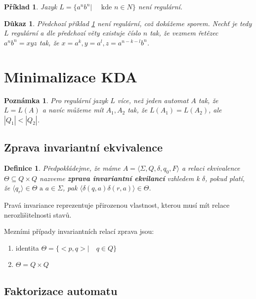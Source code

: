 \documentclass[10pt, a4paper, titlepage]{article}
\theoremstyle{note}
\newtheorem{definice}{\textbf{Definice}}
\newtheorem{dukaz}{\textbf{Důkaz}}
\newtheorem{priklad}{\textbf{Příklad}}
\newtheorem{poznamka}{\textbf{Poznámka}}
\begin{document}
\begin{priklad}\label{priklad-reg}
 Jazyk $L = \lbrace a^{n}b^{n} | \quad \text{ kde } n \in N \rbrace$ není regulární.
\end{priklad}

\begin{dukaz}
 Předchozí příklad \ref{priklad-reg} není regulární, což dokážeme sporem. Nechť je tedy $L$ regulární a dle předchozí
věty existuje číslo $n$ tak, že vezmem řetězec $a^{n}b^{n} = xyz$ tak, že $x = a^{k}, y = a^{l}, z = a^{n-k-l}b^{n}$.
\end{dukaz}


\section{Minimalizace KDA}

\begin{poznamka}
Pro regulární jazyk $L$ více, než jeden automat $A$ tak, že $L = L(A)$ a navíc můžeme mít $A_{1}, A_{2}$ tak, že
$L(A_{1}) = L(A_{2})$, ale $|Q_{1}| < |Q_{2}|$.
\end{poznamka}

\subsection{Zprava invariantní ekvivalence}

\begin{definice}
Předpokládejme, že máme $A = \langle \Sigma, Q, \delta, q_{0}, F \rangle$ a relaci ekvivalence $\Theta \subseteq Q \times Q$ nazveme
\textbf{zprava invariantní ekvilancí} vzhledem k $\delta$, pokud platí, že $\langle q_{r}  \rangle \in \Theta \text{ a } a \in \Sigma$,
pak $\langle  \delta(q, a) \delta(r, a) \rangle \in \Theta$.
\end{definice}

Pravá invariance reprezentuje přirozenou vlastnost, kterou musí mít relace nerozlišitelnosti stavů.

Mezními případy invariantních relací zprava jsou:
\begin{enumerate}
\item 
identita $\Theta = \lbrace <p,q> | \quad q \in Q \rbrace$
\item
$\Theta = Q \times Q$
\end{enumerate}

\subsection{Faktorizace automatu}
\end{document}
